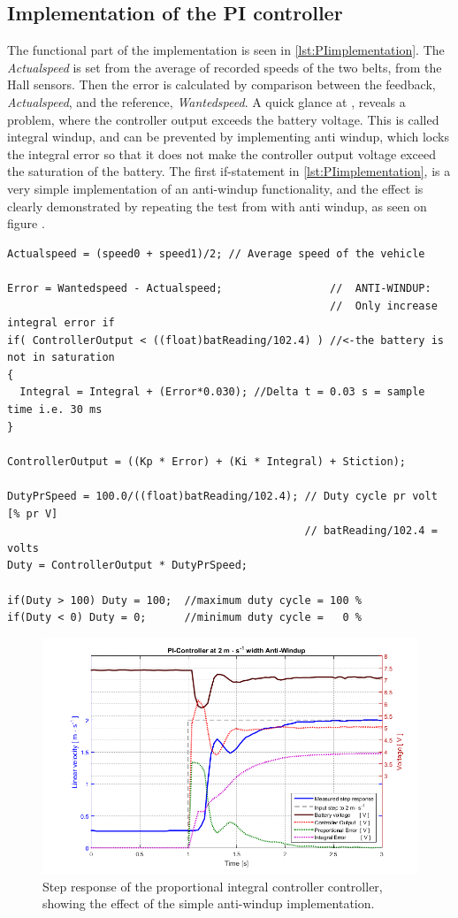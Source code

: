 \subsection{Implementation of the PI controller}
The functional part of the implementation is seen in \autoref{lst:PIimplementation}. The \emph{Actualspeed} is set from the average of recorded speeds of the two belts, from the Hall sensors. Then the error is calculated by comparison between the feedback, \emph{Actualspeed}, and the reference, \emph{Wantedspeed}.
A quick glance at , reveals a problem, where the controller output exceeds the battery voltage. This is called integral windup, and can be prevented by implementing anti windup, which locks the integral error so that it does not make the controller output voltage exceed the saturation of the battery\cite{BGLiptak}. The first if-statement in \autoref{lst:PIimplementation}, is a very simple implementation of an anti-windup functionality, and the effect is clearly demonstrated by repeating the test from  with anti windup, as seen on figure .
%
\begin{lstlisting}
Actualspeed = (speed0 + speed1)/2; // Average speed of the vehicle

Error = Wantedspeed - Actualspeed;                 //  ANTI-WINDUP:
                                                   //  Only increase integral error if
if( ControllerOutput < ((float)batReading/102.4) ) //<-the battery is not in saturation
{
  Integral = Integral + (Error*0.030); //Delta t = 0.03 s = sample time i.e. 30 ms
}

ControllerOutput = ((Kp * Error) + (Ki * Integral) + Stiction);

DutyPrSpeed = 100.0/((float)batReading/102.4); // Duty cycle pr volt [% pr V]
                                               // batReading/102.4 = volts
Duty = ControllerOutput * DutyPrSpeed;

if(Duty > 100) Duty = 100;  //maximum duty cycle = 100 %
if(Duty < 0) Duty = 0;      //minimum duty cycle =   0 %
\end{lstlisting}
%
\begin{figure}[H]
 	\centering
 	\includegraphics[width=.9\textwidth]{figures/PIwidthAntiWindup}
 	\caption{Step response of the proportional integral controller controller, showing the effect of the simple anti-windup implementation.}
 	\label{fig:PIwithAntiWindup}
\end{figure}
